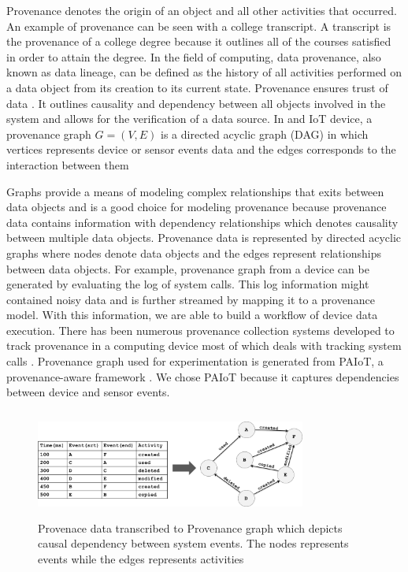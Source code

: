 Provenance denotes the origin of an object and all other activities that occurred. An example of provenance can be seen with a college transcript. A transcript is the provenance of a college degree because it outlines all of the courses satisfied in order to attain the degree. In the field of computing, data provenance, also known as data lineage, can be defined
as the history of all activities performed on a data object from its creation to its current state. Provenance ensures trust of data \cite{Bertino2015}. It outlines causality and dependency between all objects involved in the system and allows for the verification of a data source. In and IoT device, a provenance graph $G= (V, E)$ is a directed acyclic graph (DAG) in  which vertices represents device or sensor events data and the edges corresponds to the interaction between them 

Graphs provide a means of modeling complex relationships that exits between data objects and is a good choice for modeling provenance because provenance data contains information with dependency relationships which denotes causality between multiple data objects. Provenance data is represented by directed acyclic graphs where nodes denote data objects and the edges represent relationships between data objects. For example, provenance graph from a device can be generated  by evaluating the log of system calls. This log information might contained noisy data and is further streamed by mapping it to a provenance model. With this information, we are able to build a workflow of device data execution. There has been numerous provenance collection systems developed to track provenance in a computing device most of which deals with tracking system calls \cite{pasquier-socc2017,acsac,Muniswamy-Reddy}. Provenance graph used for experimentation is generated from PAIoT, a provenance-aware framework  \cite{} . We chose PAIoT because it captures dependencies between device and sensor events. 

\begin{figure}[h!]
\begin{center}
\includegraphics[height=1.4in, width=3.5in]{provenance_graph_2.png}
\end{center}
\caption{Provenace data transcribed to Provenance graph which depicts causal dependency between system events. The nodes represents events while the edges represents activities}
\label{Provenance_graph}
\end{figure}

